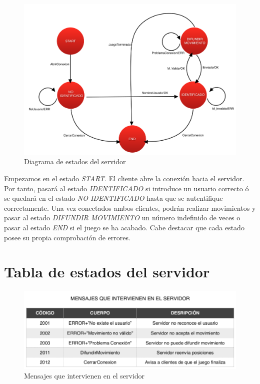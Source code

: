 \begin{figure}[h]
	\centering
	\includegraphics[width=.8\textwidth]{img/1}
	\caption{Diagrama de estados del servidor}
\end{figure}
	

Empezamos en el estado \textit{START}. El cliente abre la conexión hacia el servidor. Por tanto, pasará al estado \textit{IDENTIFICADO} si introduce un usuario correcto ó se quedará en el estado \textit{NO IDENTIFICADO} hasta que se autentifique correctamente. Una vez conectados ambos clientes, podrán realizar movimientos y pasar al estado \textit{DIFUNDIR MOVIMIENTO} un número indefinido de veces o pasar al estado \textit{END} si el juego se ha acabado. Cabe destacar que cada estado posee su propia comprobación de errores.
	












\newpage


\section{Tabla de estados del servidor}

\begin{figure}[h]
	\centering
	\includegraphics[width=.8\textwidth]{img/3}
	\caption{Mensajes que intervienen en el servidor}
\end{figure}


















